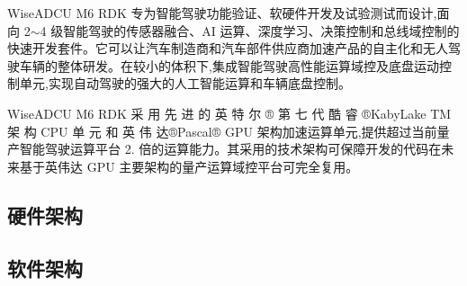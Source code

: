 \enskip{}\enskip{}\enskip{}\enskip{}Wise\+A\+D\+CU M6 R\+DK 专为智能驾驶功能验证、软硬件开发及试验测试而设计,面向 2$\sim$4 级智能驾驶的传感器融合、\+AI 运算、深度学习、决策控制和总线域控制的快速开发套件。它可以让汽车制造商和汽车部件供应商加速产品的自主化和无人驾驶车辆的整体研发。在较小的体积下,集成智能驾驶高性能运算域控及底盘运动控制单元,实现自动驾驶的强大的人工智能运算和车辆底盘控制。

\enskip{}\enskip{}\enskip{}\enskip{}Wise\+A\+D\+CU M6 R\+DK 采 用 先 进 的 英 特 尔 ® 第 七 代 酷 睿 ®\+Kaby\+Lake T\+M架 构 C\+PU 单 元 和 英 伟 达®\+Pascal® G\+PU 架构加速运算单元,提供超过当前量产智能驾驶运算平台 2. 倍的运算能力。其采用的技术架构可保障开发的代码在未来基于英伟达 G\+PU 主要架构的量产运算域控平台可完全复用。

\subsection*{硬件架构}

\begin{center}\end{center} 

\subsection*{软件架构}

\begin{center}\end{center}  